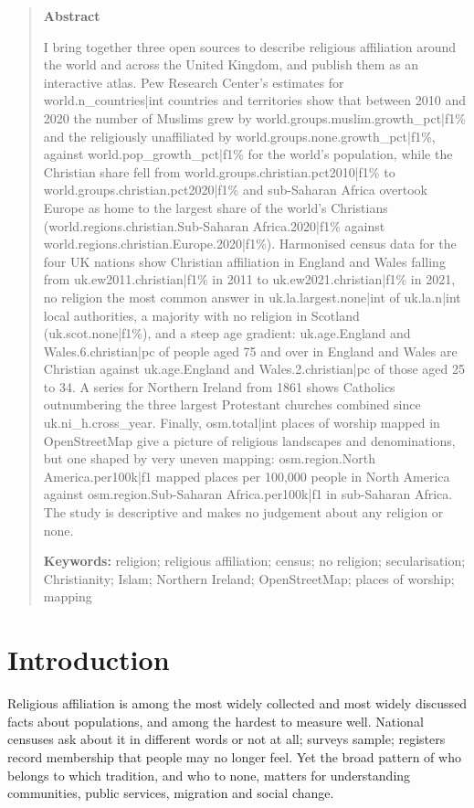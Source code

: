 \documentclass[11pt,a4paper]{article}
\begin{document}
\begin{quote}
\small
\begin{center}\textbf{Abstract}\end{center}
I bring together three open sources to describe religious affiliation around the world and across the United Kingdom, and publish them as an interactive atlas. Pew Research Center's estimates for {{world.n_countries|int}} countries and territories show that between 2010 and 2020 the number of Muslims grew by {{world.groups.muslim.growth_pct|f1}}\% and the religiously unaffiliated by {{world.groups.none.growth_pct|f1}}\%, against {{world.pop_growth_pct|f1}}\% for the world's population, while the Christian share fell from {{world.groups.christian.pct2010|f1}}\% to {{world.groups.christian.pct2020|f1}}\% and sub-Saharan Africa overtook Europe as home to the largest share of the world's Christians ({{world.regions.christian.Sub-Saharan Africa.2020|f1}}\% against {{world.regions.christian.Europe.2020|f1}}\%). Harmonised census data for the four UK nations show Christian affiliation in England and Wales falling from {{uk.ew2011.christian|f1}}\% in 2011 to {{uk.ew2021.christian|f1}}\% in 2021, no religion the most common answer in {{uk.la.largest.none|int}} of {{uk.la.n|int}} local authorities, a majority with no religion in Scotland ({{uk.scot.none|f1}}\%), and a steep age gradient: {{uk.age.England and Wales.6.christian|pc}} of people aged 75 and over in England and Wales are Christian against {{uk.age.England and Wales.2.christian|pc}} of those aged 25 to 34. A series for Northern Ireland from 1861 shows Catholics outnumbering the three largest Protestant churches combined since {{uk.ni_h.cross_year}}. Finally, {{osm.total|int}} places of worship mapped in OpenStreetMap give a picture of religious landscapes and denominations, but one shaped by very uneven mapping: {{osm.region.North America.per100k|f1}} mapped places per 100,000 people in North America against {{osm.region.Sub-Saharan Africa.per100k|f1}} in sub-Saharan Africa. The study is descriptive and makes no judgement about any religion or none.

\textbf{Keywords:} religion; religious affiliation; census; no religion; secularisation; Christianity; Islam; Northern Ireland; OpenStreetMap; places of worship; mapping
\end{quote}

\section{Introduction}
Religious affiliation is among the most widely collected and most widely discussed facts about populations, and among the hardest to measure well. National censuses ask about it in different words or not at all; surveys sample; registers record membership that people may no longer feel. Yet the broad pattern of who belongs to which tradition, and who to none, matters for understanding communities, public services, migration and social change.
\end{document}
